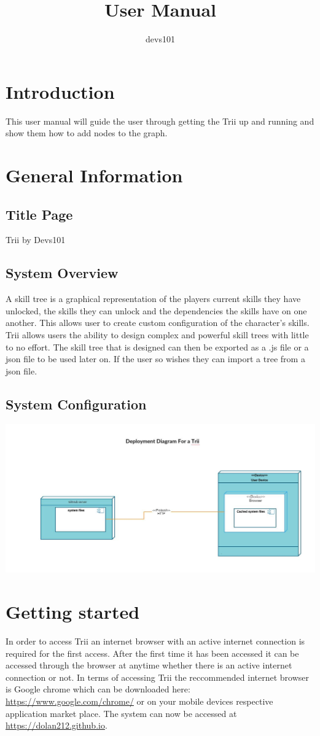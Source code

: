 \documentclass{article}
\title{User Manual}
\author{devs101}
\begin{document}
\maketitle
\tableofcontents
\newpage

\section{Introduction}
This user manual will guide the user through getting the Trii up and running and show them how to add nodes to the graph.
\section{General Information}
\subsection{Title Page}
Trii by Devs101
\subsection{System Overview}
A skill tree is a graphical representation of the players current skills they have unlocked, the skills they can unlock and the dependencies the skills have on one another. This allows user to create custom configuration of the character's skills. Trii allows users the ability to design complex and powerful skill trees with little to no effort. The skill tree that is designed can then be exported as a .js file or a json file to be used later on. If the user so wishes they can import a tree from a json file.
\subsection{System Configuration}
\includegraphics[scale=0.3]{deployment}\\
\section{Getting started}
In order to access Trii an internet browser with an active internet connection is required for the first access. After the first time it has been accessed it can be accessed through the browser at anytime whether there is an active internet connection or not. In terms of accessing Trii the reccommended internet browser is Google chrome which can be downloaded here: \href{https://www.google.com/chrome/}{https://www.google.com/chrome/} or on your mobile devices respective application market place. The system can now be accessed at \href{https://dolan212.github.io}{https://dolan212.github.io}.
\end{document}
